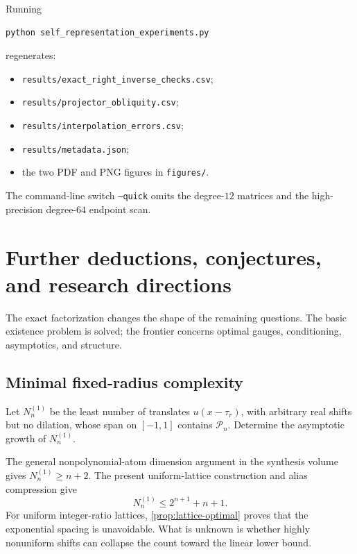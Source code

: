 \documentclass[11pt,oneside]{article}
\numberwithin{equation}{section}
\theoremstyle{definition}
\theoremstyle{remark}
\newcommand{\PiN}{\mathcal P}
\begin{document}
Running
\begin{lstlisting}[style=pythonstyle]
python self_representation_experiments.py
\end{lstlisting}
regenerates:
\begin{itemize}
\item \nolinkurl{results/exact_right_inverse_checks.csv};
\item \nolinkurl{results/projector_obliquity.csv};
\item \nolinkurl{results/interpolation_errors.csv};
\item \nolinkurl{results/metadata.json};
\item the two PDF and PNG figures in \nolinkurl{figures/}.
\end{itemize}
The command-line switch \texttt{--quick} omits the degree-$12$ matrices and
the high-precision degree-$64$ endpoint scan.

\section{Further deductions, conjectures, and research directions}
\label{sec:frontiers}

The exact factorization changes the shape of the remaining questions.  The
basic existence problem is solved; the frontier concerns optimal gauges,
conditioning, asymptotics, and structure.

\subsection{Minimal fixed-radius complexity}

\begin{problem}
\label{prob:fixed-radius-complexity}
Let $N_n^{(1)}$ be the least number of translates $u(x-\tau_r)$, with
arbitrary real shifts but no dilation, whose span on $[-1,1]$ contains
$\PiN_n$.  Determine the asymptotic growth of $N_n^{(1)}$.
\end{problem}

The general nonpolynomial-atom dimension argument in the synthesis volume
gives $N_n^{(1)}\ge n+2$.  The present uniform-lattice construction and alias
compression give
\begin{equation}
 N_n^{(1)}\le2^{n+1}+n+1.
 \label{eq:N-fixed-bounds}
\end{equation}
For uniform integer-ratio lattices, \cref{prop:lattice-optimal} proves that
the exponential spacing is unavoidable.  What is unknown is whether highly
nonuniform shifts can collapse the count toward the linear lower bound.
\end{document}
